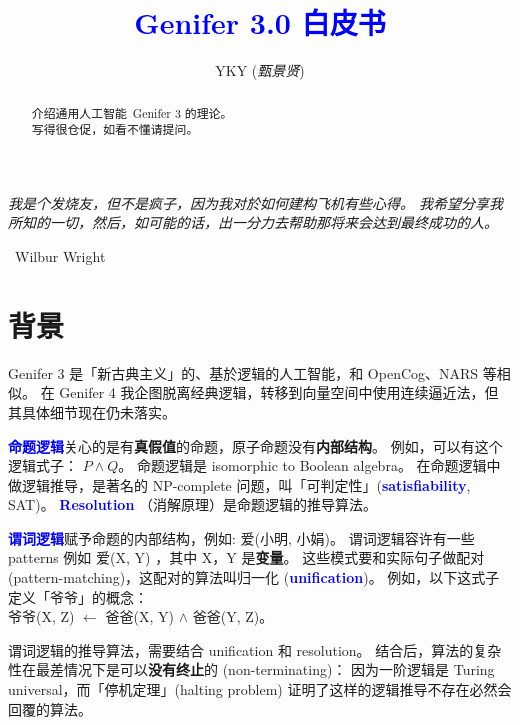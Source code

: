 \documentclass[12pt]{article}
\title{\textcolor{blue}{Genifer 3.0 白皮书}}
\author{YKY (\textit{甄景贤})}
\newcommand{\concept}[1]{\textbf{\textcolor{blue}{#1}}}
\newcommand{\formula}[1]{\textcolor{LogicColor}{#1}}
\newcommand{\tab}{\hspace*{1cm}}
\begin{document}
\tab\tab\tab \parbox{11cm}{\textit{我是个发烧友，但不是疯子，因为我对於如何建构飞机有些心得。 我希望分享我所知的一切，然后，如可能的话，出一分力去帮助那将来会达到最终成功的人。}}
\vspace{-0.5cm}
\begin{flushright}
\textemdash \, Wilbur Wright
\end{flushright}


{\let\newpage\relax\maketitle}

\maketitle
\setlength{\parindent}{0em}
\setlength{\parskip}{1.5ex plus0.5ex minus1.2ex}

\begin{abstract}
\noindent 介绍通用人工智能\  Genifer 3 的理论。\\
写得很仓促，如看不懂请提问。
\end{abstract}

\section{背景}

Genifer 3 是「新古典主义」的、基於逻辑的人工智能，和 OpenCog、NARS 等相似。 在 Genifer 4 我企图脱离经典逻辑，转移到向量空间中使用连续逼近法，但其具体细节现在仍未落实。 

\concept{命题逻辑}关心的是有\textbf{真假值}的命题，原子命题没有\textbf{内部结构}。 例如，可以有这个逻辑式子： $P \wedge Q$。  命题逻辑是 isomorphic to Boolean algebra。  在命题逻辑中做逻辑推导，是著名的 NP-complete 问题，叫「可判定性」(\concept{satisfiability}, SAT)。  \concept{Resolution} （消解原理）是命题逻辑的推导算法。

\concept{谓词逻辑}赋予命题的内部结构，例如: \formula{爱(小明, 小娟)}。  谓词逻辑容许有一些 patterns 例如 \formula{爱(X, Y)} ，其中 X，Y 是\textbf{变量}。  这些模式要和实际句子做配对 (pattern-matching)，这配对的算法叫归一化 (\concept{unification})。  例如，以下这式子定义「爷爷」的概念：\\
\tab\formula{爷爷(X, Z) $\leftarrow$ 爸爸(X, Y) $\wedge$ 爸爸(Y, Z)}。

谓词逻辑的推导算法，需要结合 unification 和 resolution。  结合后，算法的复杂性在最差情况下是可以\textbf{没有终止}的 (non-terminating)： 因为一阶逻辑是 Turing universal，而「停机定理」(halting problem) 证明了这样的逻辑推导不存在必然会回覆的算法。
\end{document}
